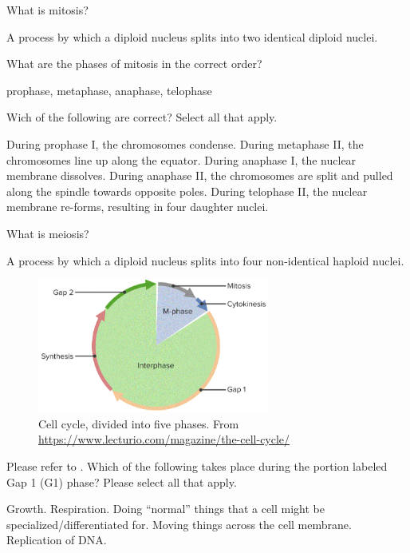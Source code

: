 \documentclass[exam,addpoints,noanswers]{exam}
\begin{document}
\begin{questions}
\question[1] What is mitosis? 
\begin{solution}[\fill]
A process by which a diploid nucleus splits into two identical diploid nuclei. 
\end{solution}

\question[1] What are the phases of mitosis in the correct order?
\begin{solution}[\fill]
prophase, metaphase, anaphase, telophase
\end{solution}

\question[1] Wich of the following are correct? Select all that apply.
\begin{choices}
\CorrectChoice During prophase I, the chromosomes condense. 
\CorrectChoice During metaphase II, the chromosomes line up along the equator.
\CorrectChoice During anaphase I, the nuclear membrane dissolves.
\CorrectChoice During anaphase II, the chromosomes are split and pulled along the spindle towards opposite poles.
\CorrectChoice During telophase II, the nuclear membrane re-forms, resulting in four daughter nuclei.
\end{choices}

\question[1] What is meiosis? 
\begin{solution}[\fill]
A process by which a diploid nucleus splits into four non-identical haploid nuclei.
\end{solution}

\clearpage
\begin{figure}[th]
\begin{center}
\includegraphics[width=3in]{cellcycle.png}
\end{center}
\caption{Cell cycle, divided into five phases. From \url{https://www.lecturio.com/magazine/the-cell-cycle/}}
\label{fig:cellcycle}
\end{figure}

\question[1] Please refer to . Which of the following takes place during the portion labeled Gap 1 (G1) phase? Please select all that apply. 
\begin{choices}
\CorrectChoice Growth.
\CorrectChoice Respiration.
\CorrectChoice Doing ``normal'' things that a cell might be specialized/differentiated for.
\CorrectChoice Moving things across the cell membrane. 
\choice Replication of DNA. 
\end{choices}


\end{questions}
\end{document}
